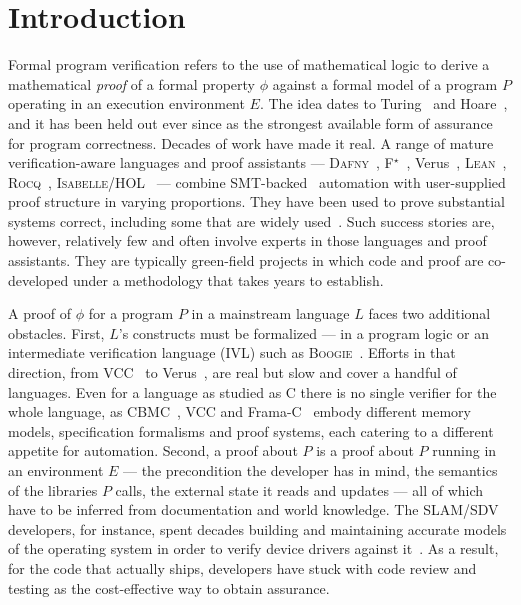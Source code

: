 \documentclass[11pt,letterpaper]{article}
\newcommand{\daf}{\textsc{Dafny}}
\newcommand{\boog}{\textsc{Boogie}}
\begin{document}
\section{Introduction}
\label{sec:intro}

Formal program verification refers to the use of mathematical logic to derive
a mathematical \emph{proof} of a formal property $\phi$ against a
formal model of a program $P$ operating in an execution environment $E$. 
The idea dates to Turing~\cite{turing1949} and
Hoare~\cite{hoare1969}, and it has been held out ever since as the strongest
available form of assurance for program correctness. Decades of work have made
it real. A range of mature verification-aware languages and proof assistants ---
\daf{}~\cite{leino2010dafny}, F$^\star$~\cite{swamy2016fstar},
Verus~\cite{lattuada2023verus}, \textsc{Lean}~\cite{demoura2021lean},
\textsc{Rocq}~\cite{rocq}, \textsc{Isabelle/HOL}~\cite{nipkow2002isabelle} ---
combine SMT-backed~\cite{barrett2016smtlib,demoura2008z3} automation with user-supplied proof
structure in varying proportions. They have been used to prove substantial
systems correct, including some that are widely used~\cite{klein2009sel4,leroy2009compcert,bhargavan2017everest,cutler2024cedar}.
Such success stories are, however, relatively few and often involve experts in
those languages and proof assistants. They are typically green-field projects
in which code and proof are co-developed under a methodology that takes years
to establish.

A proof of $\phi$ for a program $P$ in a mainstream language $L$ faces two
additional obstacles. First, $L$'s constructs must be formalized --- in a program logic or
an intermediate verification language (IVL) such as
\boog{}~\cite{barnett2006boogie}. Efforts in that direction, from
VCC~\cite{cohen2009vcc} to Verus~\cite{lattuada2023verus}, are real but slow and
cover a handful of languages. Even for a language as studied as C there is no
single verifier for the whole language, as \textsc{CBMC}~\cite{clarke2004cbmc},
VCC and Frama-C~\cite{kirchner2015framac} embody different memory models,
specification formalisms and proof systems, each catering to a different
appetite for automation. Second, a proof about $P$ is a proof about $P$ running
in an environment $E$ --- the precondition the developer has in mind, the
semantics of the libraries $P$ calls, the external state it reads and updates
--- all of which have to be inferred from documentation and world knowledge. The
\textsc{SLAM/SDV} developers, for instance, spent decades building
and maintaining accurate models of the operating system in order to verify
device drivers against it~\cite{ball2011slam}. As a result, for the code that actually
ships, developers have stuck with code review and testing as the cost-effective
way to obtain assurance.
\end{document}
